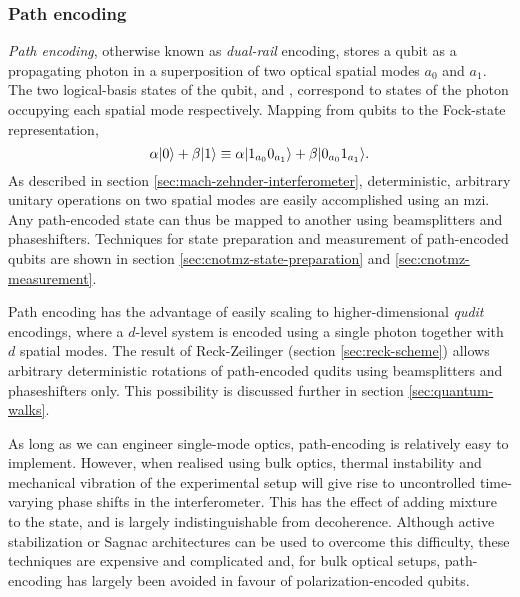 \subsubsection{Path encoding}
\label{sec:path-encoding}
\emph{Path encoding}, otherwise known as \emph{dual-rail} encoding, stores a qubit as a propagating photon in a superposition of two optical spatial modes $a_0$ and $a_1$. The two logical-basis states of the qubit,  and , correspond to states of the photon occupying each spatial mode respectively. Mapping from qubits to the Fock-state representation,
\begin{equation}
    \alpha \mbox{$ | 0 \rangle $} + \beta \mbox{$ | 1 \rangle $}  \equiv 
    \alpha \mbox{$ | 1_{a_0}0_{a_1} \rangle $} + \beta \mbox{$ | 0_{a_0}1_{a_1} \rangle $} .
\end{equation}
As described in section \ref{sec:mach-zehnder-interferometer}, deterministic, arbitrary unitary operations on two spatial modes are easily accomplished using an \gls{mzi}. Any path-encoded state can thus be mapped to another using beamsplitters and phaseshifters.
Techniques for state preparation and measurement of path-encoded qubits are shown in section \ref{sec:cnotmz-state-preparation} and \ref{sec:cnotmz-measurement}.

Path encoding has the advantage of easily scaling to higher-dimensional \emph{qudit} encodings, where a $d$-level system is encoded using a single photon together with $d$ spatial modes. The result of Reck-Zeilinger (section \ref{sec:reck-scheme}) allows arbitrary deterministic rotations of path-encoded qudits using beamsplitters and phaseshifters only. This possibility is discussed further in section \ref{sec:quantum-walks}.

As long as we can engineer single-mode optics, path-encoding  is relatively easy to implement. However, when realised using bulk optics, thermal instability and mechanical vibration of the experimental setup will give rise to uncontrolled time-varying phase shifts in the interferometer. This has the effect of adding mixture to the state, and is largely indistinguishable from decoherence. Although active stabilization or Sagnac architectures can be used to overcome this difficulty, these techniques are expensive and complicated and, for bulk optical setups, path-encoding has largely been avoided in favour of polarization-encoded qubits. 

